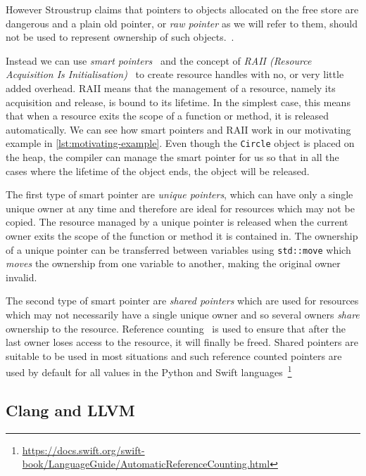 \documentclass{mpaper}
\begin{document}
    However Stroustrup claims that pointers to objects allocated on the free store are dangerous and a plain old pointer, or \emph{raw pointer} as we will refer to them, should not be used to represent ownership of such objects.~\cite{Stroustrup2018}.

    Instead we can use \emph{smart pointers}~\cite{Dimov2003} and the concept of \emph{RAII (Resource Acquisition Is Initialisation)}~\cite{Stroustrup2000} to create resource handles with no, or very little added overhead.
    RAII means that the management of a resource, namely its acquisition and release, is bound to its lifetime. 
    In the simplest case, this means that when a resource exits the scope of a function or method, it is released automatically.
    We can see how smart pointers and RAII work in our motivating example in  \autoref{lst:motivating-example}.
    Even though the \texttt{Circle} object is placed on the heap, the compiler can manage the smart pointer for us so that in all the cases where the lifetime of the object ends, the object will be released. 

    The first type of smart pointer are \emph{unique pointers}, which can have only a single unique owner at any time and therefore are ideal for resources which may not be copied.
    The resource managed by a unique pointer is released when the current owner exits the scope of the function or method it is contained in.
    The ownership of a unique pointer can be transferred between variables using \texttt{std::move} which \emph{moves} the ownership from one variable to another, making the original owner invalid.

    The second type of smart pointer are \emph{shared pointers} which are used for resources which may not necessarily have a single unique owner and so several owners \emph{share} ownership to the resource.
    Reference counting~\cite{Collins1960} is used to ensure that after the last owner loses access to the resource, it will finally be freed.
    Shared pointers are suitable to be used in most situations and such reference counted pointers are used by default for all values in the Python and Swift languages~\footnote{\url{https://docs.swift.org/swift-book/LanguageGuide/AutomaticReferenceCounting.html}}
    
    \subsection{Clang and LLVM}\label{subsec:clang-and-llvm}
    
\end{document}

